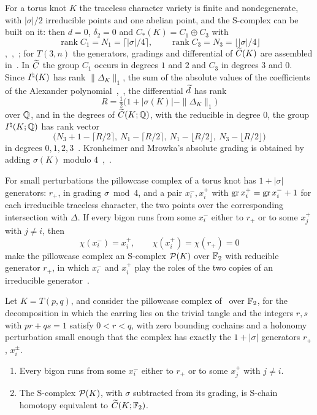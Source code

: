 For a torus knot $K$ the traceless character variety is finite and nondegenerate, with $|\sigma|/2$ irreducible
points and one abelian point, and the S-complex can be built on it: then $d=0$, $\delta_2=0$ and
$C_*(K)=C_1\oplus C_3$ with
\[
\operatorname{rank}C_1=N_1=\lceil|\sigma|/4\rceil,\qquad \operatorname{rank}C_3=N_3=\lfloor|\sigma|/4\rfloor
\]
\cite[\S1, Cor.~3]{DScaduto},~\cite[\S9.5]{DSEquiv},~\cite{W26}; for $T(3,n)$ the generators, gradings and
differential of $\widetilde C(K)$ are assembled in~\cite{WuebbenI}. In $\widetilde C$ the group $C_1$ occurs in degrees $1$ and
$2$ and $C_3$ in degrees $3$ and $0$. Since $I^{\natural}(K)$ has rank $\|\Delta_K\|_1$, the sum of the absolute values
of the coefficients of the Alexander polynomial~\cite[Prop.~1.4]{KM2},~\cite[Cor.~1.8]{LiYe}, the differential
$\widetilde d$ has rank
\[
R=\tfrac12\bigl(1+|\sigma(K)|-\|\Delta_K\|_1\bigr)
\]
over $\mathbb{Q}$, and in the degrees of $\widetilde C(K;\mathbb{Q})$, with the reducible in degree $0$, the group $I^{\natural}(K;\mathbb{Q})$ has rank
vector
\begin{equation}\label{eq:gradedInat}
\bigl(N_3+1-\lceil R/2\rceil,\ N_1-\lceil R/2\rceil,\ N_1-\lfloor R/2\rfloor,\ N_3-\lfloor R/2\rfloor\bigr)
\end{equation}
in degrees $0,1,2,3$~\cite{W26}. Kronheimer and Mrowka's absolute grading is obtained by adding $\sigma(K)$
modulo $4$~\cite{W26},~\cite[Thm.~8.9]{DSEquiv}.

For small perturbations the pillowcase complex of a torus knot has $1+|\sigma|$ generators: $r_+$, in grading $\sigma\bmod4$, and a
pair $x_i^-,x_i^+$ with $\operatorname{gr} x_i^+=\operatorname{gr} x_i^-+1$ for each irreducible traceless character, the two points over
the corresponding intersection with $\Delta$. If every bigon runs from some $x_i^-$ either to $r_+$ or to some
$x_j^+$ with $j\neq i$, then
\[
\chi(x_i^-)=x_i^+,\qquad \chi(x_i^+)=\chi(r_+)=0
\]
make the pillowcase complex an S-complex $\mathcal{P}(K)$ over $\mathbb{F}_2$ with reducible generator $r_+$, in which $x_i^-$
and $x_i^+$ play the roles of the two copies of an irreducible generator~\cite{W26}.

\begin{conjecture}[{\cite{W26}}]\label{conj:pillow}
Let $K=T(p,q)$, and consider the pillowcase complex of~\cite[\S\S10--11]{HHK2} over $\mathbb{F}_2$, for the
decomposition in which the earring lies on the trivial tangle and the integers $r,s$ with $pr+qs=1$ satisfy
$0<r<q$, with zero bounding cochains and a holonomy perturbation small enough that the complex has exactly
the $1+|\sigma|$ generators $r_+$, $x_i^\pm$.
\begin{enumerate}
\item[(a)] Every bigon runs from some $x_i^-$ either to $r_+$ or to some $x_j^+$ with $j\neq i$.
\item[(b)] The S-complex $\mathcal{P}(K)$, with $\sigma$ subtracted from its grading, is S-chain homotopy
equivalent to $\widetilde C(K;\mathbb{F}_2)$.
\end{enumerate}
\end{conjecture}

